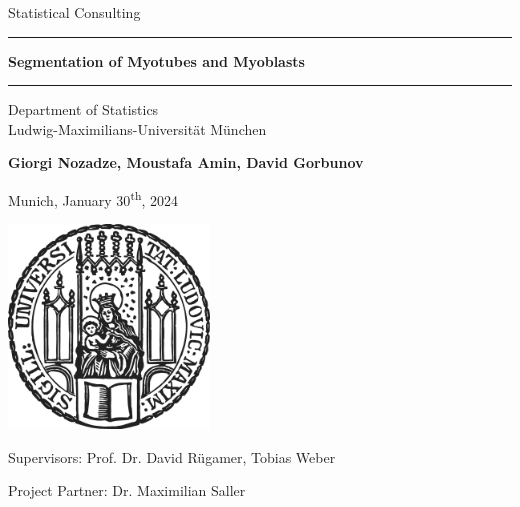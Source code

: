 \documentclass[12pt]{article}
\newcommand{\mytitle}{Segmentation of Myotubes and Myoblasts}
\newcommand{\myname}{Giorgi Nozadze, Moustafa Amin, David Gorbunov}
\newcommand{\mysupervisor}{Prof. Dr. David Rügamer, Tobias Weber}
\newcommand{\mypartner}{Dr. Maximilian Saller}
\numberwithin{equation}{section}
\numberwithin{figure}{section}
\begin{document}
	
	
	\begin{titlepage}
		\begin{center}
			
			\LARGE
			Statistical Consulting
			
			\vspace{0.5cm}
			
			\rule{\textwidth}{1.5pt}
			\LARGE
			\textbf{\mytitle}
			\rule{\textwidth}{1.5pt}
			
			\vspace{0.5cm}
			
			\large
			Department of Statistics \\
			Ludwig-Maximilians-Universität München 
			
			\vfill
			
			\Large
			\textbf{\myname}
			
			\vfill
			
			\large
			Munich, January 30\textsuperscript{th}, 2024
			
			\vfill
			
			\includegraphics[width = 0.4\textwidth]{sigillum.png}
			
			\vfill
			
			\normalsize
			
			Supervisors: \mysupervisor
			
			\vfill
			
			Project Partner: \mypartner
			
		\end{center}
	\end{titlepage}
	\tableofcontents
	\newpage
	\setcounter{page}{1}
	
	
	
	
	
	
	
	\newpage
	\printbibliography
	\appendix
	\cleardoublepage
	
\end{document}
